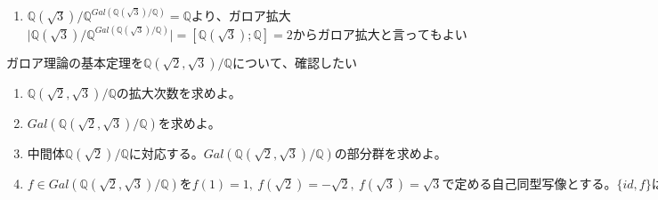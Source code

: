 \documentclass[dvipdfmx]{jsarticle}
\begin{document}
\begin{description}
\begin{enumerate}
\begin{enumerate}
      \item $\mathbb{Q}(\sqrt{3}) / \mathbb{Q}^{Gal(\mathbb{Q}(\sqrt{3}) / \mathbb{Q})} = \mathbb{Q}より、ガロア拡大$\\
      $\mid \mathbb{Q}(\sqrt{3}) / \mathbb{Q}^{Gal(\mathbb{Q}(\sqrt{3}) / \mathbb{Q})} \mid = [\mathbb{Q}(\sqrt{3}) ; \mathbb{Q}] = 2からガロア拡大と言ってもよい$
    \end{enumerate}
  \end{enumerate}
\end{description}

\begin{tcolorbox}[colframe=black!50,colback=white,colbacktitle=black!50,coltitle=white,fonttitle=\bfseries\sffamily,title=問題2]
$ガロア理論の基本定理を\mathbb{Q}(\sqrt{2},\sqrt{3}) / \mathbb{Q}について、確認したい$
\begin{enumerate}
  \item $\mathbb{Q}(\sqrt{2},\sqrt{3}) / \mathbb{Q}の拡大次数を求めよ。$
  \item $Gal(\mathbb{Q}(\sqrt{2},\sqrt{3}) / \mathbb{Q})を求めよ。$
  \item $中間体\mathbb{Q}(\sqrt{2}) / \mathbb{Q}に対応する。Gal(\mathbb{Q}(\sqrt{2},\sqrt{3}) / \mathbb{Q})の部分群を求めよ。$
  \item $f \in Gal(\mathbb{Q}(\sqrt{2},\sqrt{3}) / \mathbb{Q})をf(1)=1, \ f(\sqrt{2}) = -\sqrt{2}, \ f(\sqrt{3}) = \sqrt{3}で定める自己同型写像とする。\{id,f\}はGal(\mathbb{Q}(\sqrt{2},\sqrt{3}) / \mathbb{Q})の部分群となるが、これに対応する中間体を求めよ。$
\end{enumerate}
\end{tcolorbox}
\end{document}
